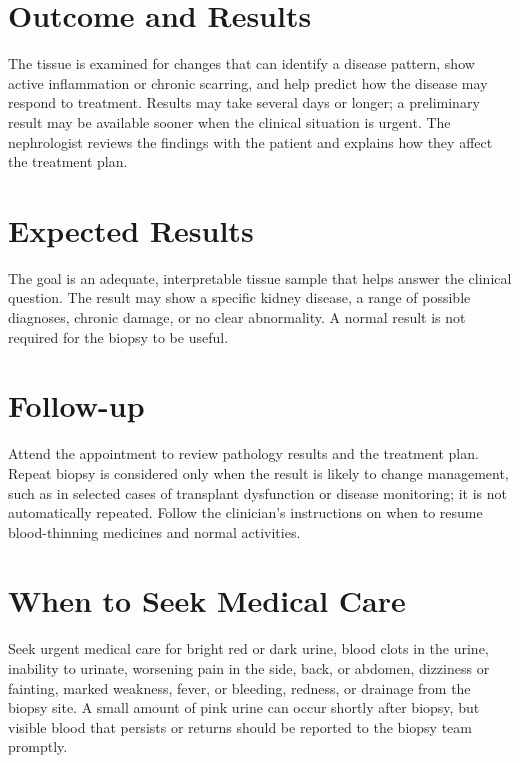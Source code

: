 \section*{Outcome and Results}
The tissue is examined for changes that can identify a disease pattern, show active inflammation or chronic scarring, and help predict how the disease may respond to treatment. Results may take several days or longer; a preliminary result may be available sooner when the clinical situation is urgent. The nephrologist reviews the findings with the patient and explains how they affect the treatment plan.

\section*{Expected Results}
The goal is an adequate, interpretable tissue sample that helps answer the clinical question. The result may show a specific kidney disease, a range of possible diagnoses, chronic damage, or no clear abnormality. A normal result is not required for the biopsy to be useful.

\section*{Follow-up}
Attend the appointment to review pathology results and the treatment plan. Repeat biopsy is considered only when the result is likely to change management, such as in selected cases of transplant dysfunction or disease monitoring; it is not automatically repeated. Follow the clinician's instructions on when to resume blood-thinning medicines and normal activities.

\section*{When to Seek Medical Care}
Seek urgent medical care for bright red or dark urine, blood clots in the urine, inability to urinate, worsening pain in the side, back, or abdomen, dizziness or fainting, marked weakness, fever, or bleeding, redness, or drainage from the biopsy site. A small amount of pink urine can occur shortly after biopsy, but visible blood that persists or returns should be reported to the biopsy team promptly.

